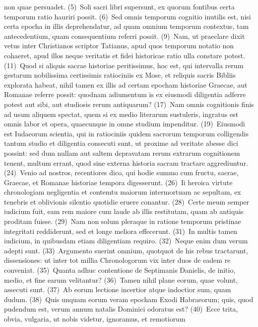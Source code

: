 \documentclass[draft,12pt,twoside,a4paper]{book}
\newcommand{\lnr}[1]{\nrfont({#1})~\normalfont}
\begin{document}
non quae persuadet.
\lnr{5}Soli sacri libri supersunt, ex quorum fontibus
certa temporum ratio hauriri possit.
\lnr{6}Sed omnis temporum cognitio
inutilis est, nisi certa epocha in illis deprehendatur, ad quam omnium
temporum contextus, tam antecedentium, quam consequentium referri
possit.
\lnr{9}Nam, ut praeclare dixit vetus inter Christianos scriptor
Tatianus, apud quos temporum notatio non cohaeret, apud illos neque
veritatis et fidei historicae ratio ulla constare potest.
\lnr{11}Quod si aliquis
sacrae historiae peritissimus, hoc est, qui intervalla rerum gestarum
nobilissima certissimis ratiociniis ex Mose, et
 reliquis sacris Bibliis explorata
habeat, nihil tamen ex illis ad certam epocham historiae Graecae,
aut Romanae referre possit: quodnam adiumentum is ex eiusmodi
diligentia adferre potest aut sibi, aut studiosis rerum antiquarum?
\lnr{17}Nam omnis cognitionis finis ad usum aliquem spectat, quem si ex medio
literarum sustuleris, ingratus est omnis labor et opera, quaecunque
in omne studium impenditur.
\lnr{19}Eiusmodi est Iudaeorum scientia, qui
in ratiociniis quidem sacrorum temporum colligendis tantum studio
et diligentia consecuti sunt, ut proxime ad veritate abesse dici possint: sed
dum nullam aut saltem depravatam rerum extrarum cognitionem
tenent, multum errant, quod sine externa historia sacram tractare
aggrediuntur.
\lnr{24}Venio ad nostros, recentiores dico, qui hodie summo
cum fructu, sacrae, Graecae, et Romanae historiae tempora digesserunt.
\lnr{26}Ii heroica virtute chronologiam negligentia et contemtu maiorum
intermortuam ac sepultam, ex tenebris et oblivionis silentio quotidie
eruere conantur.
\lnr{28}Certe meum semper iudicium fuit, eam rem maiore
cum laude ab illis restitutam, quam ab antiquis proditam fuisse.
\lnr{29}Nam
non solum pleraque in ratione temporum pristinae integritati reddiderunt,
sed et longe meliora effecerunt.
\lnr{31}In multis tamen iudicium, in quibusdam
etiam diligentiam requiro.
\lnr{32}Neque enim dum verum adepti sunt.
\lnr{33}Argumento suerint omnium, quotquot de his rebus tractarunt,
 dissensiones:
ut inter tot millia Chronologorum vix inter duos de eadem re
conveniat.
\lnr{35}Quanta adhuc contentione de Septimanis Danielis, de initio,
medio, et fine earum velitantur?
\lnr{36}Tamen nihil plane eorum, quae volunt,
assecuti sunt.
\lnr{37}Ab eorum lectione incertior atque indoctior sum,
quam dudum.
\lnr{38}Quis unquam eorum veram epocham Exodi Habraeorum;
quis, quod pudendum est, verum annum natalis Dominici odoratus
est?
\lnr{40}Ecce trita, obvia, vulgaria, ut nobis videtur, ignoramus, et remotiorum
\end{document}
